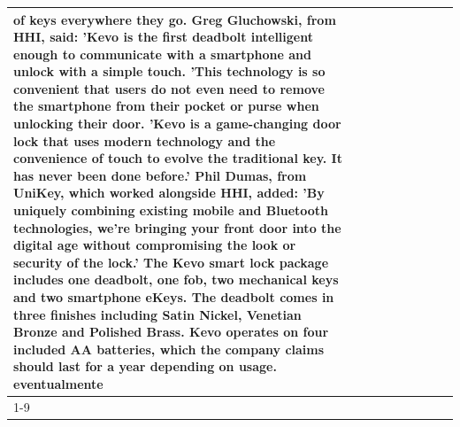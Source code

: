 \begin{table}[H]
\begin{tabular}{lllrlllll}
of keys everywhere they go. Greg Gluchowski, from HHI, said: 'Kevo is the first deadbolt intelligent enough to communicate with a smartphone and unlock with a simple touch. 'This technology is so convenient that users do not even need to remove the smartphone from their pocket or purse when unlocking their door. 'Kevo is a game-changing door lock that uses modern technology and the convenience of touch to evolve the traditional key. It has never been done before.' Phil Dumas, from UniKey, which worked alongside HHI, added: 'By uniquely combining existing mobile and Bluetooth technologies, we’re bringing your front door into the digital age without compromising the look or security of the lock.' The Kevo smart lock package includes one deadbolt, one fob, two mechanical keys and two smartphone eKeys. The deadbolt comes in three finishes including Satin Nickel, Venetian Bronze and Polished Brass. Kevo operates on four included AA batteries, which the company claims should last for a year depending on usage. eventualmente \\
\cline{1-9}

\end{tabular}
\end{table}

